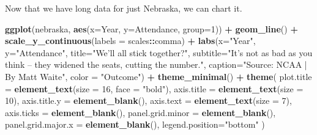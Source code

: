 \documentclass[
]{book}
\newenvironment{Shaded}{\begin{snugshade}}{\end{snugshade}}
\newcommand{\DataTypeTok}[1]{\textcolor[rgb]{0.13,0.29,0.53}{#1}}
\newcommand{\DecValTok}[1]{\textcolor[rgb]{0.00,0.00,0.81}{#1}}
\newcommand{\KeywordTok}[1]{\textcolor[rgb]{0.13,0.29,0.53}{\textbf{#1}}}
\newcommand{\NormalTok}[1]{#1}
\newcommand{\OperatorTok}[1]{\textcolor[rgb]{0.81,0.36,0.00}{\textbf{#1}}}
\newcommand{\StringTok}[1]{\textcolor[rgb]{0.31,0.60,0.02}{#1}}
\begin{document}
\begin{Shaded}
\end{Shaded}

Now that we have long data for just Nebraska, we can chart it.

\begin{Shaded}
\begin{Highlighting}[]
\KeywordTok{ggplot}\NormalTok{(nebraska, }\KeywordTok{aes}\NormalTok{(}\DataTypeTok{x=}\NormalTok{Year, }\DataTypeTok{y=}\NormalTok{Attendance, }\DataTypeTok{group=}\DecValTok{1}\NormalTok{)) }\OperatorTok{+}\StringTok{ }
\StringTok{  }\KeywordTok{geom_line}\NormalTok{() }\OperatorTok{+}\StringTok{ }
\StringTok{  }\KeywordTok{scale_y_continuous}\NormalTok{(}\DataTypeTok{labels =}\NormalTok{ scales}\OperatorTok{::}\NormalTok{comma) }\OperatorTok{+}\StringTok{ }
\StringTok{  }\KeywordTok{labs}\NormalTok{(}\DataTypeTok{x=}\StringTok{"Year"}\NormalTok{, }\DataTypeTok{y=}\StringTok{"Attendance"}\NormalTok{, }\DataTypeTok{title=}\StringTok{"We'll all stick together?"}\NormalTok{, }\DataTypeTok{subtitle=}\StringTok{"It's not as bad as you think -- they widened the seats, cutting the number."}\NormalTok{, }\DataTypeTok{caption=}\StringTok{"Source: NCAA | By Matt Waite"}\NormalTok{, }\DataTypeTok{color =} \StringTok{"Outcome"}\NormalTok{) }\OperatorTok{+}
\StringTok{  }\KeywordTok{theme_minimal}\NormalTok{() }\OperatorTok{+}\StringTok{ }
\StringTok{  }\KeywordTok{theme}\NormalTok{(}
    \DataTypeTok{plot.title =} \KeywordTok{element_text}\NormalTok{(}\DataTypeTok{size =} \DecValTok{16}\NormalTok{, }\DataTypeTok{face =} \StringTok{"bold"}\NormalTok{),}
    \DataTypeTok{axis.title =} \KeywordTok{element_text}\NormalTok{(}\DataTypeTok{size =} \DecValTok{10}\NormalTok{),}
    \DataTypeTok{axis.title.y =} \KeywordTok{element_blank}\NormalTok{(),}
    \DataTypeTok{axis.text =} \KeywordTok{element_text}\NormalTok{(}\DataTypeTok{size =} \DecValTok{7}\NormalTok{),}
    \DataTypeTok{axis.ticks =} \KeywordTok{element_blank}\NormalTok{(),}
    \DataTypeTok{panel.grid.minor =} \KeywordTok{element_blank}\NormalTok{(),}
    \DataTypeTok{panel.grid.major.x =} \KeywordTok{element_blank}\NormalTok{(),}
    \DataTypeTok{legend.position=}\StringTok{"bottom"}
\NormalTok{  )}
\end{Highlighting}
\end{Shaded}
\end{document}
